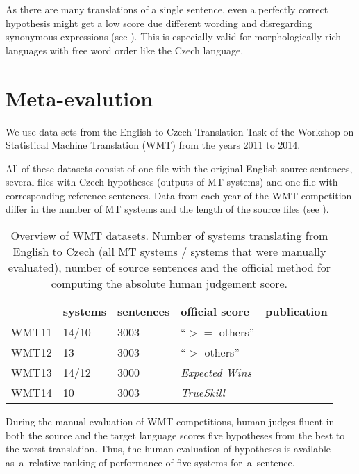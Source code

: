 As there are many translations of a single sentence, even a perfectly correct hypothesis might get a low score due different wording and disregarding synonymous expressions (see ). 
This is especially valid for morphologically rich languages with free word order like the Czech language. \cite{bojar-tackling-sparse-data}





\section{Meta-evalution}

We use data sets from the English-to-Czech Translation Task of the Workshop on
Statistical Machine Translation (WMT) from the years 2011 to 2014.

All of these datasets consist of one file with the original English source sentences,
several files with Czech hypotheses (outputs of MT systems) and one file with corresponding 
reference sentences. Data from each year of the WMT competition differ in the 
number of MT systems and the length of the source files (see ). 


\begin{table}[h]
\centering
\begin{tabular}{l|l|l|l|l}
      & systems & sentences & official score & publication\\
\hline
WMT11 & 14/10    & 3003      & “$ >= $ others”      & \cite{wmt11}  \\
WMT12 & 13          & 3003      & “$ > $ others”      & \cite{wmt12}  \\
WMT13 & 14/12    & 3000      & \textit{Expected Wins} & \cite{wmt13}  \\
WMT14 & 10          & 3003      & \textit{TrueSkill}   & \cite{wmt14}
\end{tabular}
\caption{Overview of WMT datasets. Number of systems translating from English 
to Czech (all MT systems / systems that were manually evaluated), number of 
source sentences and the official method for computing the absolute human 
judgement score.}
\label{wmt-data}
\end{table}

During the manual evaluation of WMT competitions, human judges fluent in both
the source and the target language scores five hypotheses from the best to
the worst translation. Thus, the human evaluation of hypotheses is available 
as~a~relative ranking of performance of five systems for~a~sentence. 

